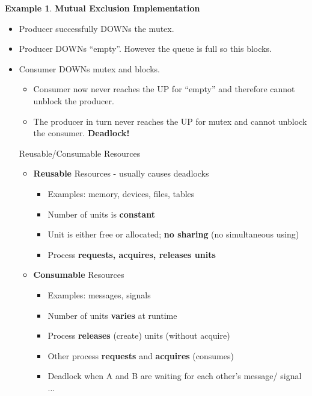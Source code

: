 \documentclass[12pt,a4paper]{article}
\theoremstyle{definition}
\newtheorem{example}{Example}[section]
\newenvironment{myitemize}
{ \begin{itemize}
    \setlength{\itemsep}{5pt}
    \setlength{\parskip}{0pt}
    \setlength{\parsep}{0pt}     }
{ \end{itemize}                  }
\begin{document}
\begin{example}{\textbf{Mutual Exclusion Implementation}}
\begin{myitemize}
\begin{myitemize}
\begin{tcolorbox}
				\centering
			\end{tcolorbox}
			\item Producer successfully DOWNs the mutex.
			\item Producer DOWNs “empty”. However the queue is full so this blocks.
			\item Consumer DOWNs mutex and blocks.
			\begin{myitemize}
				\item Consumer now never reaches the UP for “empty” and therefore cannot unblock the producer.
				\item The producer in turn never reaches the UP for mutex and cannot unblock the consumer. \textbf{Deadlock!}
			\end{myitemize}
			\begin{tcolorbox}
				\textsf{Reusable/Consumable Resources}
				\begin{myitemize}
					\item \textbf{Reusable} Resources - usually causes deadlocks
					\begin{myitemize}
						\item Examples: memory, devices, files, tables 
						\item Number of units is \textbf{constant}
						\item Unit is either free or allocated; \textbf{no sharing} (no simultaneous using) 
						\item Process \textbf{requests, acquires, releases units}
					\end{myitemize}
					\item \textbf{Consumable} Resources
					\begin{myitemize}
						\item Examples: messages, signals
						\item Number of units \textbf{varies} at runtime 
						\item Process \textbf{releases} (create) units (without acquire) 
						\item Other process \textbf{requests} and \textbf{acquires} (consumes)
						\item Deadlock when A and B are waiting for each other's message/ signal $\dots$
					\end{myitemize}
				\end{myitemize}
			\end{tcolorbox}
		\end{myitemize}
	\end{myitemize}
\end{example}
\end{document}
